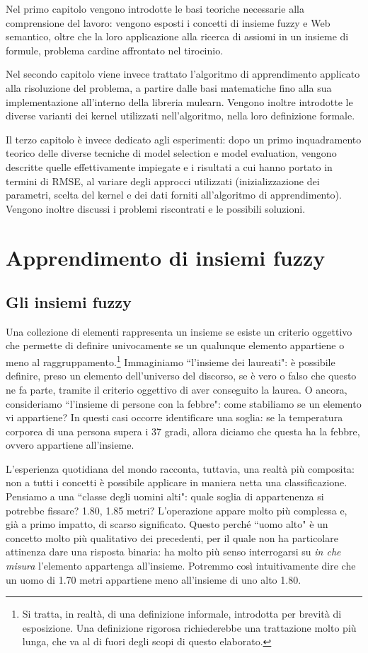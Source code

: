 \documentclass[12pt,a4paper]{report}
\begin{document}
Nel primo capitolo vengono introdotte le basi teoriche necessarie alla comprensione del lavoro: vengono esposti i concetti di insieme fuzzy e Web semantico, oltre che la loro applicazione alla ricerca di assiomi in un insieme di formule, problema cardine affrontato nel tirocinio.

Nel secondo capitolo viene invece trattato l'algoritmo di apprendimento applicato alla risoluzione del problema, a partire dalle basi matematiche fino alla sua implementazione all'interno della libreria mulearn. Vengono inoltre introdotte le diverse varianti dei kernel utilizzati nell'algoritmo, nella loro definizione formale.

Il terzo capitolo è invece dedicato agli esperimenti: dopo un primo inquadramento teorico delle diverse tecniche di model selection e model evaluation, vengono descritte quelle effettivamente impiegate e i risultati a cui hanno portato in termini di RMSE, al variare degli approcci utilizzati (inizializzazione dei parametri, scelta del kernel e dei dati forniti all'algoritmo di apprendimento). Vengono inoltre discussi i problemi riscontrati e le possibili soluzioni.


\chapter{Apprendimento di insiemi fuzzy}
\section{Gli insiemi fuzzy}

Una collezione di elementi rappresenta un insieme se esiste un criterio oggettivo che permette di definire univocamente se un qualunque elemento appartiene o meno al raggruppamento.\footnote{Si tratta, in realtà, di una definizione informale, introdotta per brevità di esposizione. Una definizione rigorosa richiederebbe una trattazione molto più lunga, che va al di fuori degli scopi di questo elaborato.}
Immaginiamo ``l'insieme dei laureati": è possibile definire, preso un elemento dell'universo del discorso,  se è vero o falso che questo ne fa parte, tramite il criterio oggettivo di aver conseguito la laurea. O ancora, consideriamo  ``l'insieme di persone con la febbre": come stabiliamo se un elemento vi appartiene?
In questi casi occorre identificare una soglia: se la temperatura corporea di una persona supera i 37 gradi, allora diciamo che questa ha la febbre, ovvero appartiene all'insieme.

L'esperienza quotidiana del mondo racconta, tuttavia, una realtà più composita: non a tutti i concetti è possibile applicare in maniera netta una classificazione.
Pensiamo a una ``classe degli uomini alti"\cite{fuzzysetspaper}: quale soglia di appartenenza si potrebbe fissare? 1.80, 1.85 metri? 
L'operazione appare molto più complessa e, già a primo impatto, di scarso significato. Questo perché ``uomo alto" è un concetto molto più qualitativo dei precedenti, per il quale non ha particolare attinenza dare una risposta binaria: ha molto più senso interrogarsi su \emph{in che misura} l'elemento appartenga all'insieme. Potremmo così intuitivamente dire che un uomo di 1.70 metri appartiene meno all'insieme di uno alto 1.80.
\end{document}
